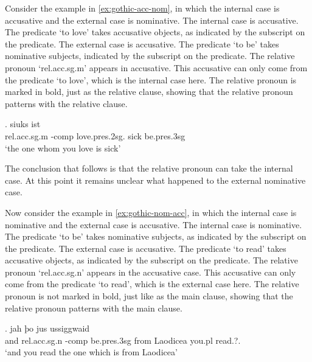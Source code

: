 Consider the example in \ref{ex:gothic-acc-nom}, in which the internal case is accusative and the external case is nominative.
The internal case is accusative. The predicate  `to love' takes accusative objects, as indicated by the subscript on the predicate.
The external case is accusative. The predicate  `to be' takes nominative subjects, indicated by the subscript on the predicate.
The relative pronoun  `\ac{rel}.\ac{acc}.\ac{sg}.\ac{m}' appears in accusative. This accusative can only come from the predicate  `to love', which is the internal case here. The relative pronoun is marked in bold, just as the relative clause, showing that the relative pronoun patterns with the relative clause.

\exg.    siuks ist\\
 \ac{rel}.\ac{acc}.\ac{sg}.\ac{m} -\ac{comp} love.\ac{pres}.2\ac{sg}.\scsub{[acc]} sick be.\ac{pres}.3\ac{sg}\scsub{[nom]}\\
 `the one whom you love is sick' \label{ex:gothic-acc-nom}

The conclusion that follows is that the relative pronoun can take the internal case. At this point it remains unclear what happened to the external nominative case.

Now consider the example in \ref{ex:gothic-nom-acc}, in which the internal case is nominative and the external case is accusative.
The internal case is nominative. The predicate  `to be' takes nominative subjects, as indicated by the subscript on the predicate.
The external case is accusative. The predicate  `to read' takes accusative objects, as indicated by the subscript on the predicate.
The relative pronoun  `\ac{rel}.\ac{acc}.\ac{sg}.\ac{n}' appears in the accusative case. This accusative can only come from the predicate  `to read', which is the external case here. The relative pronoun is not marked in bold, just like as the main clause, showing that the relative pronoun patterns with the main clause.

\exg. jah þo     jus ussiggwaid\\
 and \ac{rel}.\ac{acc}.\ac{sg}.\ac{n} -\ac{comp} be.\ac{pres}.3\ac{sg}\scsub{[nom]} from Laodicea you.\ac{pl} read.?.\scsub{[acc]}\\
 `and you read the one which is from Laodicea' \label{ex:gothic-nom-acc}

